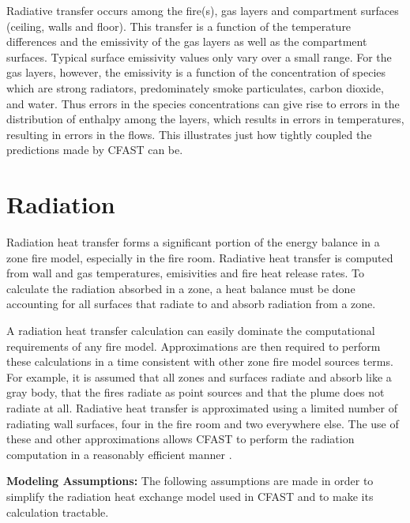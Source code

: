 Radiative transfer occurs among the fire(s), gas layers and compartment surfaces (ceiling, walls and floor).  This transfer is a function of the temperature differences and the emissivity of the gas layers as well as the compartment surfaces.  Typical surface emissivity values only vary over a small range.  For the gas layers, however, the emissivity is a function of the concentration of species which are strong radiators, predominately smoke particulates, carbon dioxide, and water.  Thus errors in the species concentrations can give rise to errors in the distribution of enthalpy among the layers, which results in errors in temperatures, resulting in errors in the flows.  This illustrates just how tightly coupled the predictions made by CFAST can be.

\section{Radiation}
\label{sec:Radiation}

Radiation heat transfer forms a significant portion of the energy balance in a zone fire model, especially in the fire room.  Radiative heat transfer is computed from wall and gas temperatures, emisivities and fire heat release rates.  To calculate the radiation absorbed in a zone, a heat balance must be done accounting for all surfaces that radiate to and absorb radiation from a zone.

A radiation heat transfer calculation can easily dominate the computational requirements of any fire model.  Approximations are then required to perform these calculations in a time consistent with other zone fire model sources terms.  For example, it is assumed that all zones and surfaces radiate and absorb like a gray body, that the fires radiate as point sources and that the plume does not radiate at all.  Radiative heat transfer is approximated using a limited number of radiating wall surfaces, four in the fire room and two everywhere else.  The use of these and other approximations allows CFAST to perform the radiation computation in a reasonably efficient manner \cite{Forney_radiation}.

{ \bf Modeling Assumptions:}  The following assumptions are made in order to simplify the radiation heat exchange model used in CFAST and to make its calculation tractable.

